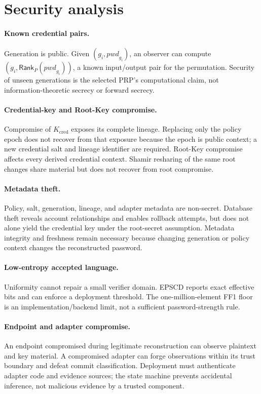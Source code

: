 \documentclass[preprint,12pt]{elsarticle}
\newcommand{\Rank}{\mathsf{Rank}}
\begin{document}
\section{Security analysis}

\paragraph{Known credential pairs.}
Generation is public. Given $(g_i,\mathit{pwd}_{g_i})$, an observer can compute
$(g_i,\Rank_P(\mathit{pwd}_{g_i}))$, a known input/output pair for the
permutation. Security of unseen generations is the selected PRP's computational
claim, not information-theoretic secrecy or forward secrecy.

\paragraph{Credential-key and Root-Key compromise.}
Compromise of $K_{\mathrm{cred}}$ exposes its complete lineage. Replacing only
the policy epoch does not recover from that exposure because the epoch is public
context; a new credential salt and lineage identifier are required. Root-Key
compromise affects every derived credential context. Shamir resharing of the
same root changes share material but does not recover from root compromise.

\paragraph{Metadata theft.}
Policy, salt, generation, lineage, and adapter metadata are non-secret. Database
theft reveals account relationships and enables rollback attempts, but does not
alone yield the credential key under the root-secret assumption. Metadata
integrity and freshness remain necessary because changing generation or policy
context changes the reconstructed password.

\paragraph{Low-entropy accepted language.}
Uniformity cannot repair a small verifier domain. EPSCD reports exact effective
bits and can enforce a deployment threshold. The one-million-element FF1 floor
is an implementation/backend limit, not a sufficient password-strength rule.

\paragraph{Endpoint and adapter compromise.}
An endpoint compromised during legitimate reconstruction can observe plaintext
and key material. A compromised adapter can forge observations within its trust
boundary and defeat commit classification. Deployment must authenticate adapter
code and evidence sources; the state machine prevents accidental inference, not
malicious evidence by a trusted component.
\end{document}
